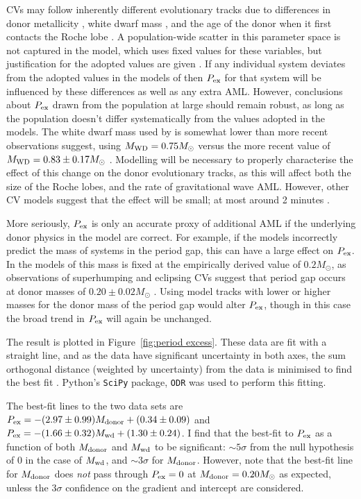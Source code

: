 CVs may follow inherently different evolutionary tracks due to differences in donor metallicity \citep{stehle1997, harrison2016}, white dwarf mass \citep{knigge2006}, and the age of the donor when it first contacts the Roche lobe \citep{howell2001}. A population-wide scatter in this parameter space is not captured in the \citet{knigge11} model, which uses fixed values for these variables, but justification for the adopted values are given \citep{knigge11, knigge2006}.
If any individual system deviates from the adopted values in the models of \citet{knigge11} then $P_{\rm ex}$ for that system will be influenced by these differences as well as any extra AML. However, conclusions about $P_{\rm ex}$ drawn from the population at large should remain robust, as long as the population doesn't differ systematically from the values adopted in the models. The white dwarf mass used by \citet{knigge11} is somewhat lower than more recent observations suggest, using $M_{\rm WD} = 0.75 M_\odot$ versus the more recent value of $M_{\rm WD} = 0.83 \pm 0.17 M_\odot$ \citep{pala2020}. Modelling will be necessary to properly characterise the effect of this change on the donor evolutionary tracks, as this will affect both the size of the Roche lobes, and the rate of gravitational wave AML. However, other CV models suggest that the effect will be small; at most around 2 minutes \citep{goliasch2015}.

More seriously, $P_{\rm ex}$ is only an accurate proxy of additional AML if the underlying donor physics in the model are correct. For example, if the models incorrectly predict the mass of systems in the period gap, this can have a large effect on $P_{\rm ex}$. In the models of \citet{knigge11} this mass is fixed at the empirically derived value of $0.2 M_\odot$, as observations of superhumping and eclipsing CVs suggest that period gap occurs at donor masses of $0.20 \pm 0.02 M_\odot$ \citep{knigge2006}. Using model tracks with lower or higher masses for the donor mass of the period gap would alter $P_{\rm ex}$, though in this case the broad trend in $P_{\rm ex}$ will again be unchanged.

The result is plotted in Figure~\ref{fig:period excess}. These data are fit with a straight line, and as the data have significant uncertainty in both axes, the sum orthogonal distance (weighted by uncertainty) from the data is minimised to find the best fit \citep{hogg2010}. Python's \lstinline{SciPy} package, \lstinline{ODR} was used to perform this fitting.

 The best-fit lines to the two data sets are $P_{\rm ex} = -(2.97\pm0.99) M_{\rm donor} + (0.34\pm0.09)$ and $P_{\rm ex} = -(1.66\pm0.32) M_{\rm wd} + (1.30\pm0.24)$.
I find that the best-fit to $P_{\rm ex}$ as a function of both $M_{\rm donor}$ and $M_{\rm wd}$ to be significant: $\sim 5\sigma$ from the null hypothesis of 0 in the case of $M_{\rm wd}$, and $\sim 3\sigma$ for $M_{\rm donor}$.
 However, note that the best-fit line for $M_{\rm donor}$ does \textit{not} pass through $P_{\rm ex} = 0$ at $M_{\rm donor} = 0.20 M_\odot$ as expected, unless the $3\sigma$ confidence on the gradient and intercept are considered.

